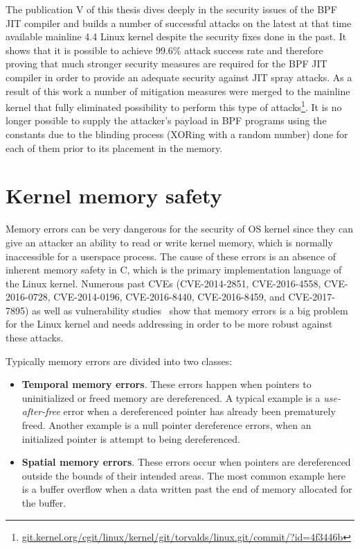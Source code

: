 The publication V of this thesis dives deeply in the security issues of the BPF JIT compiler and builds a number of successful attacks on the latest at that time available mainline 4.4 Linux kernel despite the security fixes done in the past. It shows that it is possible to achieve 99.6\% attack success rate and therefore proving that much stronger security measures are required for the BPF JIT compiler in order to provide an adequate security against JIT spray attacks. As a result of this work a number of mitigation measures were merged to the mainline kernel that fully eliminated possibility to perform this type of attacks\footnote{\url{git.kernel.org/cgit/linux/kernel/git/torvalds/linux.git/commit/?id=4f3446b}}. It is no longer possible to supply the attacker's payload in BPF programs using the constants due to the blinding process (XORing with a random number) done for each of them prior to its placement in the memory.

\section{Kernel memory safety}
\label{sec:kern-mem-safety}

Memory errors can be very dangerous for the security of OS kernel since they can give an attacker an ability to read or write kernel memory, which is normally inaccessible for a userspace process. The cause of these errors is an absence of inherent memory safety in C, which is the primary implementation language of the Linux kernel. 
Numerous past CVEs (CVE-2014-2851, CVE-2016-4558, CVE-2016-0728, CVE-2014-0196, CVE-2016-8440, CVE-2016-8459, and CVE-2017-7895) as well as vulnerability studies~\cite{raheja2016analysis, chen2011linux} show that memory errors is a big problem for the Linux kernel and needs addressing in order to be more robust against these attacks.

Typically memory errors are divided into two classes:

\begin{itemize}
	\item \textbf{Temporal memory errors}. These errors happen when pointers to uninitialized or freed memory are dereferenced. A typical example is a \emph{use-after-free} error when a dereferenced pointer has already been prematurely freed. Another example is a null pointer dereference errors, when an initialized pointer is attempt to being dereferenced. 
	\item \textbf{Spatial memory errors}. These errors occur when pointers are dereferenced outside the bounds of their intended areas. The most common example here is a buffer overflow when a data written past the end of memory allocated for the buffer. 
\end{itemize}

